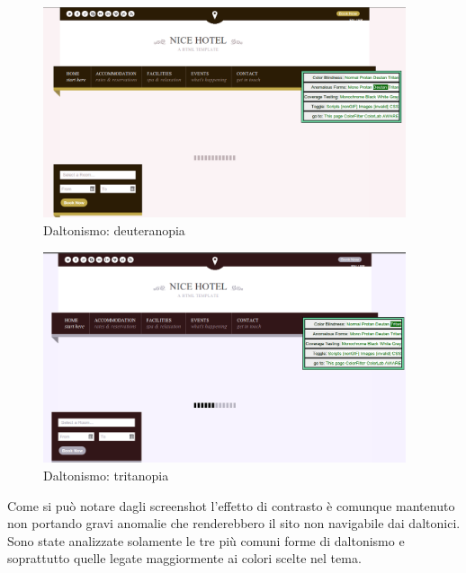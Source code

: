 \documentclass[a4paper,12pt,hidelinks]{report}
\begin{document}
\begin{figure}[h!]%
  \includegraphics[width=0.95\textwidth,keepaspectratio=true]{img/daltonismoDeuteranopia}
  \centering
  \caption{Daltonismo: deuteranopia}%
  \label{fig:daltonismoDeuteranopia}%
\end{figure}

\begin{figure}[h!]%
  \includegraphics[width=0.95\textwidth,keepaspectratio=true]{img/daltonismoTritanopia}
  \centering
  \caption{Daltonismo: tritanopia}%
  \label{fig:daltonismoTritanopia}%
\end{figure}
Come si può notare dagli screenshot l'effetto di contrasto è comunque mantenuto non portando gravi anomalie che renderebbero il sito non navigabile dai daltonici. 
\\Sono state analizzate solamente le tre più comuni forme di daltonismo e soprattutto quelle legate maggiormente ai colori scelte nel tema.
\end{document}
